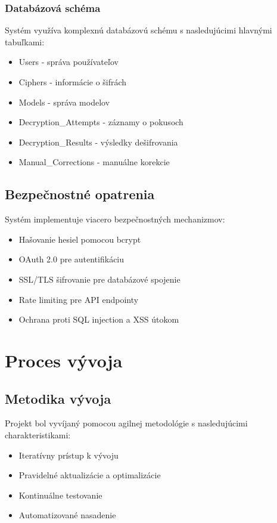 \subsection{Databázová schéma}
Systém využíva komplexnú databázovú schému s nasledujúcimi hlavnými tabuľkami:

\begin{itemize}
    \item Users - správa používateľov
    \item Ciphers - informácie o šifrách
    \item Models - správa modelov
    \item Decryption\_Attempts - záznamy o pokusoch
    \item Decryption\_Results - výsledky dešifrovania
    \item Manual\_Corrections - manuálne korekcie
\end{itemize}

\section{Bezpečnostné opatrenia}
Systém implementuje viacero bezpečnostných mechanizmov:

\begin{itemize}
    \item Hašovanie hesiel pomocou bcrypt
    \item OAuth 2.0 pre autentifikáciu
    \item SSL/TLS šifrovanie pre databázové spojenie
    \item Rate limiting pre API endpointy
    \item Ochrana proti SQL injection a XSS útokom
\end{itemize}

\chapter{Proces vývoja}

\section{Metodika vývoja}
Projekt bol vyvíjaný pomocou agilnej metodológie s nasledujúcimi charakteristikami:

\begin{itemize}
    \item Iteratívny prístup k vývoju
    \item Pravidelné aktualizácie a optimalizácie
    \item Kontinuálne testovanie
    \item Automatizované nasadenie
\end{itemize}

